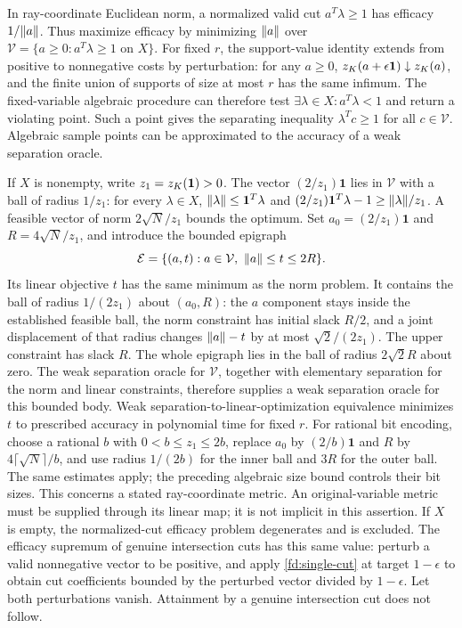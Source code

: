 \begin{remark}\label{fd:efficacy}
In ray-coordinate Euclidean norm, a normalized valid cut
$a^T\lambda\ge1$ has efficacy $1/\lVert a\rVert$. Thus maximize efficacy by
minimizing $\lVert a\rVert$ over
$\mathcal V=\{a\ge0:a^T\lambda\ge1\text{ on }X\}$.
For fixed $r$, the support-value identity extends from positive to
nonnegative costs by perturbation: for any $a\ge0$,
$z_K(a+\epsilon\mathbf1)\downarrow z_K(a)$, and the finite union of
supports of size at most $r$ has the same infimum. The fixed-variable
algebraic procedure can therefore test $\exists\lambda\in X:
a^T\lambda<1$ and return a violating point. Such a point gives the
separating inequality $\lambda^Tc\ge1$ for all $c\in\mathcal V$.
Algebraic sample points can be approximated to the accuracy of a
weak separation oracle.

If $X$ is nonempty, write $z_1=z_K(\mathbf1)>0$.
The vector $(2/z_1)\mathbf1$ lies in $\mathcal V$ with a ball of
radius $1/z_1$: for every $\lambda\in X$,
$\lVert\lambda\rVert\le\mathbf1^T\lambda$ and
$(2/z_1)\mathbf1^T\lambda-1\ge\lVert\lambda\rVert/z_1$.
A feasible vector of norm $2\sqrt N/z_1$ bounds the optimum.
Set $a_0=(2/z_1)\mathbf1$ and $R=4\sqrt N/z_1$, and introduce
the bounded epigraph
\[
 \mathcal E=\{(a,t):a\in\mathcal V,\ \lVert a\rVert\le t\le2R\}.
\]
Its linear objective $t$ has the same minimum as the norm problem.
It contains the ball of radius $1/(2z_1)$ about $(a_0,R)$:
the $a$ component stays inside the established feasible ball,
the norm constraint has initial slack $R/2$, and a joint displacement
of that radius changes $\lVert a\rVert-t$ by at most $\sqrt2/(2z_1)$.
The upper constraint has slack $R$. The whole epigraph lies in
the ball of radius $2\sqrt2R$ about zero.
The weak separation oracle for $\mathcal V$, together with
elementary separation for the norm and linear constraints,
therefore supplies a weak separation oracle for this bounded body.
Weak separation-to-linear-optimization equivalence
\citep[Corollary~4.2.7]{GrotschelLovaszSchrijver1988}
minimizes $t$ to prescribed accuracy in polynomial time for fixed $r$.
For rational bit encoding, choose a rational $b$ with
$0<b\le z_1\le2b$, replace $a_0$ by $(2/b)\mathbf1$ and $R$ by
$4\lceil\sqrt N\rceil/b$, and use radius $1/(2b)$ for the inner
ball and $3R$ for the outer ball. The same estimates apply;
the preceding algebraic size bound controls their bit sizes.
This concerns a stated ray-coordinate metric. An
original-variable metric must be supplied through its linear map;
it is not implicit in this assertion. If $X$ is empty, the
normalized-cut efficacy problem degenerates and is excluded.
The efficacy supremum of genuine intersection cuts has this same
value: perturb a valid nonnegative vector to be positive, and
apply \cref{fd:single-cut} at target $1-\epsilon$ to obtain cut
coefficients bounded by the perturbed vector divided by
$1-\epsilon$. Let both perturbations vanish. Attainment by a
genuine intersection cut does not follow.
\end{remark}

